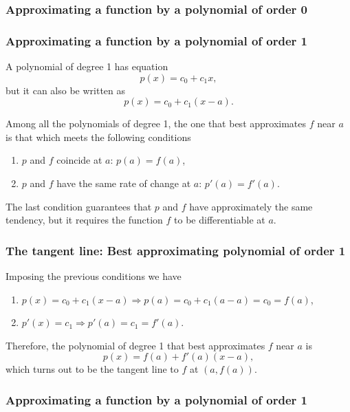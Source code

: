 \begin{frame}
\frametitle{Approximating a function by a polynomial of order 0}
\begin{center}

\end{center}
\end{frame}


\begin{frame}
\frametitle{Approximating a function by a polynomial of order 1}
A polynomial of degree 1 has equation
\[
p(x) = c_0+c_1x,
\]
but it can also be written as 
\[
p(x) = c_0+c_1(x-a).
\]

Among all the polynomials of degree 1, the one that best approximates $f$ near $a$ is that which meets the following conditions

\begin{enumerate}
\item $p$ and $f$ coincide at $a$: $p(a) = f(a)$,
\item $p$ and $f$ have the same rate of change at $a$: $p'(a) = f'(a)$.
\end{enumerate}

The last condition guarantees that $p$ and $f$ have approximately the same tendency, but it requires the function $f$ to be differentiable at $a$.
\end{frame}


\begin{frame}
\frametitle{The tangent line: Best approximating polynomial of order 1}
Imposing the previous conditions we have
\begin{enumerate}
\item $p(x)=c_0+c_1(x-a) \Rightarrow p(a)=c_0+c_1(a-a)=c_0=f(a)$,
\item $p'(x)=c_1 \Rightarrow p'(a)=c_1=f'(a)$.
\end{enumerate}

Therefore, the polynomial of degree 1 that best approximates $f$ near $a$ is
\[
p(x) = f(a)+f '(a)(x-a),
\]
which turns out to be the tangent line to $f$ at $(a,f(a))$.
\end{frame}


\begin{frame}
\frametitle{Approximating a function by a polynomial of order 1}
\begin{center}

\end{center}
\end{frame}


